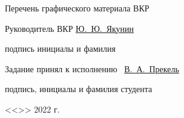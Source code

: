 \begin{spacing}{1}
{        \uline{\hfill}

        Перечень графического материала ВКР \uline{\hfill}

        \uline{\hfill}

        \uline{\hfill}

        \uline{\hfill}

        \vfill

        Руководитель ВКР
        \hfill
        \uline{\hspace{10.5ex}}
        \hspace{6ex}
        \uline{Ю.~Ю.~Якунин}

        \vspace{-4pt}

        \hfill
        {\footnotesize подпись}
        \hspace{8.5ex}
        {\footnotesize инициалы и фамилия}

        Задание принял к исполнению~
        \hfill
        \uline{\hspace{18.5ex}В.~А.~Прекель}

        \vspace{-4pt}

        \hfill
        {\footnotesize подпись, инициалы и фамилия студента}

        \vspace{1em}

        \hfill <<\uline{\hspace{3ex}}>> \uline{\hspace{9ex}} 2022 г.
    }
\end{spacing}


\clearpage

\setcounter{page}{2}
